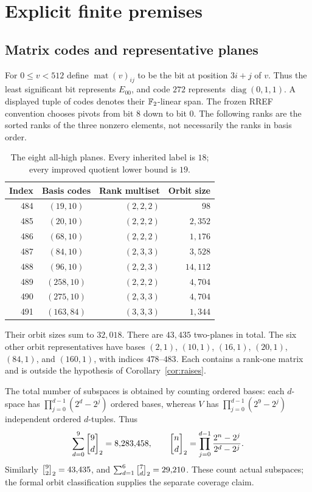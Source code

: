 \section{Explicit finite premises}\label{app:finite-data}

\subsection{Matrix codes and representative planes}
For $0\leq v<512$ define $\operatorname{mat}(v)_{ij}$ to be the bit
at position $3i+j$ of $v$. Thus the least significant bit represents
$E_{00}$, and code $272$ represents $\operatorname{diag}(0,1,1)$.
A displayed tuple of codes denotes their $\mathbb F_2$-linear span. The frozen
RREF convention chooses pivots from bit $8$ down to bit $0$.
The following ranks are the sorted ranks of the three nonzero elements,
not necessarily the ranks in basis order.

\begin{table}[htbp]
\centering
\caption{The eight all-high planes. Every inherited label is $18$;
every improved quotient lower bound is $19$.}
\label{tab:planes}
\begin{tabular}{rcrr}
\toprule
Index & Basis codes & Rank multiset & Orbit size\\
\midrule
484 & $(19,10)$ & $(2,2,2)$ & 98\\
485 & $(20,10)$ & $(2,2,2)$ & $2{,}352$\\
486 & $(68,10)$ & $(2,2,2)$ & $1{,}176$\\
487 & $(84,10)$ & $(2,3,3)$ & $3{,}528$\\
488 & $(96,10)$ & $(2,2,3)$ & $14{,}112$\\
489 & $(258,10)$ & $(2,2,2)$ & $4{,}704$\\
490 & $(275,10)$ & $(2,3,3)$ & $4{,}704$\\
491 & $(163,84)$ & $(3,3,3)$ & $1{,}344$\\
\bottomrule
\end{tabular}
\end{table}

Their orbit sizes sum to $32{,}018$. There are $43{,}435$ two-planes
in total. The six other orbit representatives have bases
$(2,1)$, $(10,1)$, $(16,1)$, $(20,1)$, $(84,1)$, and $(160,1)$,
with indices $478$--$483$. Each contains a rank-one matrix and is
outside the hypothesis of Corollary~\ref{cor:raises}.

The total number of subspaces is obtained by counting ordered bases:
each $d$-space has $\prod_{j=0}^{d-1}(2^d-2^j)$ ordered bases,
whereas $V$ has $\prod_{j=0}^{d-1}(2^9-2^j)$ independent
ordered $d$-tuples. Thus
\[
 \sum_{d=0}^9 \qbinom{9}{d}=8{,}283{,}458,
 \qquad
 \qbinom{n}{d}=\prod_{j=0}^{d-1}\frac{2^n-2^j}{2^d-2^j}.
\]
Similarly $\qbinom{9}{2}=43{,}435$, and
$\sum_{d=1}^6\qbinom{7}{d}=29{,}210$. These count actual subspaces;
the formal orbit classification supplies the separate coverage claim.

